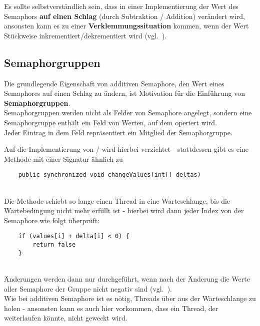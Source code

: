 \noindent
Es sollte selbstverständlich sein, dass in einer Implementierung der Wert des Semaphors \textbf{auf einen Schlag} (durch Subtraktion / Addition) verändert wird, ansonsten kann es zu einer \textbf{Verklemmungssituation} kommen, wenn der Wert Stückweise inkrementiert/dekrementiert wird (vgl.~\cite[109]{Oec22}).

\subsection{Semaphorgruppen}

Die grundlegende Eigenschaft von additiven Semaphore, den Wert eines Semaphores auf einen Schlag zu ändern, ist Motivation für die Einführung von \textbf{Semaphorgruppen}.\\

\noindent
Semaphorgruppen werden nicht als Felder von Semaphore angelegt, sondern eine Semaphorgruppe enthält ein Feld von Werten, auf dem operiert wird.\\

\noindent
Jeder Eintrag in dem Feld repräsentiert ein Mitglied der Semaphorgruppe.


\noindent
Auf die Implementierung von / wird hierbei verzichtet - stattdessen gibt es eine Methode mit einer Signatur ähnlich zu

\begin{verbatim}
    public synchronized void changeValues(int[] deltas)
\end{verbatim}\\

\noindent
Die Methode schiebt so lange einen Thread in eine Warteschlange, bis die Wartebedingung nicht mehr erfüllt ist - hierbei wird dann jeder Index von der Semaphore wie folgt überprüft:


\begin{verbatim}
    if (values[i] + delta[i] < 0) {
        return false
    }
\end{verbatim}\\

\noindent
Änderungen werden dann nur durchgeführt, wenn nach der Änderung die Werte aller Semaphore der Gruppe nicht negativ sind (vgl.~\cite[109]{Oec22}).\\

\noindent
Wie bei additiven Semaphore ist es nötig, Threads über  aus der Warteschlange zu holen - ansonsten kann es auch hier vorkommen, dass ein Thread, der weiterlaufen könnte, nicht geweckt wird.\\

